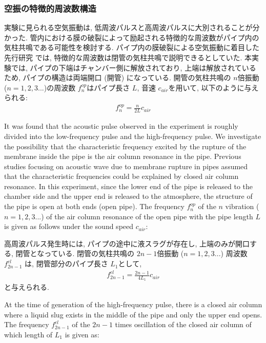 \documentclass[12pt]{article}
\begin{document}
\subsubsection{空振の特徴的周波数構造}
実験に見られる空気振動は, 低周波パルスと高周波パルスに大別されることが分かった. 
管内における膜の破裂によって励起される特徴的な周波数がパイプ内の気柱共鳴である可能性を検討する. 
パイプ内の膜破裂による空気振動に着目した先行研究 \citep{Vidal2006a, Sanchez2014} では, 特徴的な周波数は閉管の気柱共鳴で説明できるとしていた. 
本実験では, パイプの下端はチャンバー側に解放されており, 上端は解放されているため, パイプの構造は両端開口 (開管) になっている. 
開管の気柱共鳴の $n$倍振動 ($n=1,2,3...$)の周波数 $f^{op}_{n}$はパイプ長さ $L$, 音速 $c_{air}$を用いて, 以下のように与えられる:
\begin{eqnarray}
f^{op}_{n}=\frac{n}{2L} c_{air}
\end{eqnarray}

It was found that the acoustic pulse observed in the experiment is roughly divided into the low-frequency pulse and the high-frequency pulse.
We investigate the possibility that the characteristic frequency excited by the rupture of the membrane inside the pipe is the air column resonance in the pipe.
Previous studies focusing on acoustic wave due to membrane rupture in pipes \citep{Vidal 2006a, Sanchez2014} assumed that the characteristic frequencies could be explained by closed air column resonance.
In this experiment, since the lower end of the pipe is released to the chamber side and the upper end is released to the atmosphere, the structure of the pipe is open at both ends (open pipe).
The frequency $ f^{op}_{n}$ of the $n$ vibration ($ n = 1, 2, 3 ... $) of the air column resonance of the open pipe with the pipe length $ L $ is given as follows under the sound speed $ c_{air}$:

高周波パルス発生時には, パイプの途中に液スラグが存在し, 上端のみが開口する, 閉管となっている. 
閉管の気柱共鳴の $2n-1$倍振動 ($n=1,2,3...$) 周波数 $f^{cl}_{2n-1}$ は, 閉管部分のパイプ長さ $L_1$として, 
\begin{eqnarray}
f^{cl}_{2n-1}=\frac{2n-1}{4L_1} c_{air}
\end{eqnarray}
と与えられる.

At the time of generation of the high-frequency pulse, there is a closed air column where a liquid slug exists in the middle of the pipe and only the upper end opens.
The frequency $f^{cl}_{2n-1}$ of the $2n-1$ times oscillation of the closed air column of which length of $L_1$ is given as:
\end{document}
